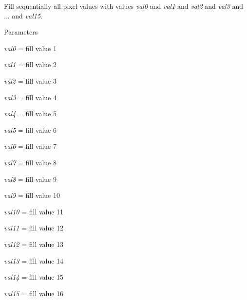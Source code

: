Fill sequentially all pixel values with values {\itshape val0\/} and {\itshape val1\/} and {\itshape val2\/} and {\itshape val3\/} and {\itshape \/}... and {\itshape val15\/}. 


\begin{DoxyParams}{Parameters}
\item[{\em val0}]= fill value 1 \item[{\em val1}]= fill value 2 \item[{\em val2}]= fill value 3 \item[{\em val3}]= fill value 4 \item[{\em val4}]= fill value 5 \item[{\em val5}]= fill value 6 \item[{\em val6}]= fill value 7 \item[{\em val7}]= fill value 8 \item[{\em val8}]= fill value 9 \item[{\em val9}]= fill value 10 \item[{\em val10}]= fill value 11 \item[{\em val11}]= fill value 12 \item[{\em val12}]= fill value 13 \item[{\em val13}]= fill value 14 \item[{\em val14}]= fill value 15 \item[{\em val15}]= fill value 16 \end{DoxyParams}
